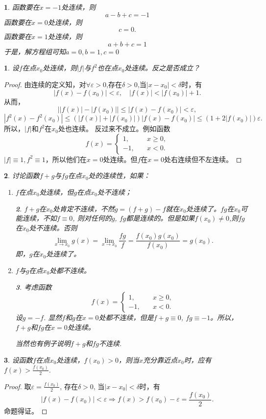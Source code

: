 \documentclass[utf8]{book}
\newtheorem{example}{}[section]             %
\newtheorem{solution}{}
\begin{document}
\begin{solution}函数要在$x=-1$处连续，则
$$a-b+c=-1$$
函数要在$x=0$处连续，则$$c=0.$$
函数要在$x=1$处连续，则$$a+b+c=1$$
于是，解方程组可知$a=0,b=1,c=0$
\end{solution}
\begin{example}
设$f$在点$x_0$处连续，则$|f|$与$f^2$也在点$x_0$处连续。反之是否成立？
\end{example}
\begin{proof}由连续的定义知，对$\forall \varepsilon > 0$,存在$\delta>0$,当$|x-x_0|<\delta$时，有
$$|f(x)-f(x_0)|<\varepsilon,\quad |f(x)| < |f(x_0)| + 1.$$
从而，
$$\left||f(x)|-|f(x_0)|\right|\leq \left|f(x)-f(x_0)\right| < \varepsilon,$$
$$|f^2(x)-f^2(x_0)|\leq (|f(x)|+|f(x_0)|)\left|f(x)-f(x_0)\right|\leq  (1+2|f(x_0)|)\varepsilon.$$
所以，$|f|$和$f^2$在$x_0$处也连续。
反过来不成立。例如函数
$$f(x) = 
\begin{cases}
1,\quad &x\geq 0,\\
-1,\quad &x < 0.
\end{cases}$$
$|f|\equiv 1, f^2\equiv 1$，所以他们在$x=0$处连续。但$f$在$x=0$处右连续但不左连续。
\end{proof}
\begin{example}讨论函数$f+g$与$fg$在点$x_0$处的连续性，如果：
\renewcommand\labelenumi{\normalfont(\theenumi)}
\begin{enumerate}
\item $f$在点$x_0$处连续，但$g$在点$x_0$处不连续；
\begin{solution}
$f+g$在$x_0$处肯定不连续，不然$g=(f+g)-f$就在$x_0$处连续了。$fg$在$x_0$可能连续，不如$f\equiv 0$, 则对任何的$g$, $fg$都是连续的。但是如果$f(x_0)\neq 0$,则$fg$在$x_0$处不连续。否则$$\displaystyle\lim_{x\to x_0}g(x)=\displaystyle\lim_{x\to x_0}\frac{fg}{f}=\frac{f(x_0)g(x_0)}{f(x_0)}=g(x_0).$$
即，$g$在$x_0$处连续了。
\end{solution}
\item $f$与$g$在点$x_0$处都不连续。
\begin{solution}考虑函数$$f(x) = 
\begin{cases}
1,\quad &x\geq 0,\\
-1,\quad &x < 0.
\end{cases}$$
设$g=-f$. 显然$f$和$g$在$x=0$处都不连续，但是$f+g\equiv 0$, $fg\equiv -1$。所以，$f+g$和$fg$在$x=0$处连续。

当然也有例子说明$f+g$和$fg$不连续.
\end{solution}
\end{enumerate}
\end{example}
\begin{example}
设函数$f$在点$x_0$处连续，$f(x_0) > 0$，则当$x$充分靠近点$x_0$时，应有$f(x)>\frac{f(x_0)}{2}$.
\end{example}
\begin{proof}取$\varepsilon = \displaystyle\frac{f(x_0)}{2}$, 存在$\delta > 0$, 当$|x-x_0| < \delta$时，有
$$|f(x)-f(x_0)| < \varepsilon\Rightarrow f(x) > f(x_0)-\varepsilon = \frac{f(x_0)}{2}.$$
命题得证。
\end{proof}
\end{document}
